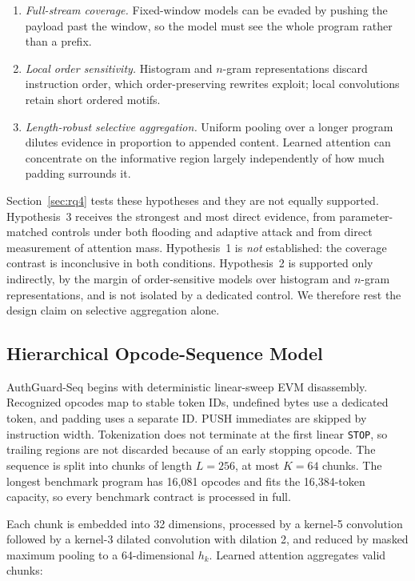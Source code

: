 \documentclass[conference]{IEEEtran}
\newcommand{\code}[1]{\texttt{#1}}
\begin{document}
\begin{enumerate}
\item \emph{Full-stream coverage.} Fixed-window models can be evaded by pushing the payload past the window, so the model must see the whole program rather than a prefix.
\item \emph{Local order sensitivity.} Histogram and $n$-gram representations discard instruction order, which order-preserving rewrites exploit; local convolutions retain short ordered motifs.
\item \emph{Length-robust selective aggregation.} Uniform pooling over a longer program dilutes evidence in proportion to appended content. Learned attention can concentrate on the informative region largely independently of how much padding surrounds it.
\end{enumerate}

Section~\ref{sec:rq4} tests these hypotheses and they are not equally supported. Hypothesis~3 receives the strongest and most direct evidence, from parameter-matched controls under both flooding and adaptive attack and from direct measurement of attention mass. Hypothesis~1 is \emph{not} established: the coverage contrast is inconclusive in both conditions. Hypothesis~2 is supported only indirectly, by the margin of order-sensitive models over histogram and $n$-gram representations, and is not isolated by a dedicated control. We therefore rest the design claim on selective aggregation alone.

\subsection{Hierarchical Opcode-Sequence Model}

AuthGuard-Seq begins with deterministic linear-sweep EVM disassembly. Recognized opcodes map to stable token IDs, undefined bytes use a dedicated token, and padding uses a separate ID. PUSH immediates are skipped by instruction width. Tokenization does not terminate at the first linear \code{STOP}, so trailing regions are not discarded because of an early stopping opcode. The sequence is split into chunks of length $L=256$, at most $K=64$ chunks. The longest benchmark program has 16,081 opcodes and fits the 16,384-token capacity, so every benchmark contract is processed in full.

Each chunk is embedded into 32 dimensions, processed by a kernel-5 convolution followed by a kernel-3 dilated convolution with dilation 2, and reduced by masked maximum pooling to a 64-dimensional $h_k$. Learned attention aggregates valid chunks:
\end{document}
